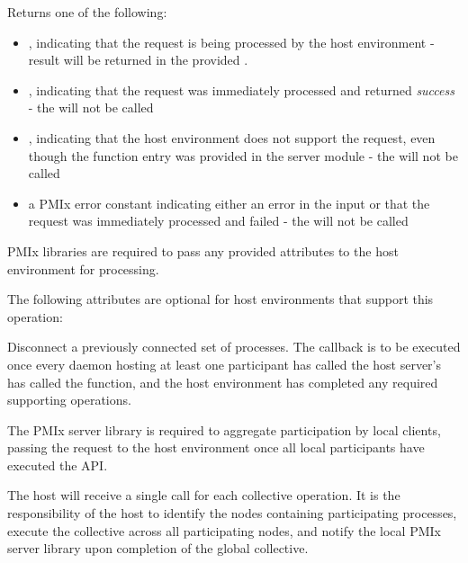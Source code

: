 Returns one of the following:

\begin{itemize}
    \item {}, indicating that the request is being processed by the host environment - result will be returned in the provided .
    \item {}, indicating that the request was immediately processed and returned \textit{success} - the  will not be called
    \item {}, indicating that the host environment does not support the request, even though the function entry was provided in the server module - the  will not be called
    \item a PMIx error constant indicating either an error in the input or that the request was immediately processed and failed - the  will not be called
\end{itemize}

\reqattrstart
{}

\ac{PMIx} libraries are required to pass any provided attributes to the host environment for processing.
\reqattrend

\optattrstart
The following attributes are optional for host environments that support this operation:


\optattrend

\descr

Disconnect a previously connected set of processes. The callback is to be executed once every daemon hosting at least one participant has called the host server's has called the  function, and the host environment has completed any required supporting operations.

\adviceimplstart
The \ac{PMIx} server library is required to aggregate participation by local clients, passing the request to the host environment once all local participants have executed the \ac{API}.
\adviceimplend

\advicermstart
The host will receive a single call for each collective operation. It is the responsibility of the host to identify the nodes containing participating processes, execute the collective across all participating nodes, and notify the local \ac{PMIx} server library upon completion of the global collective.

